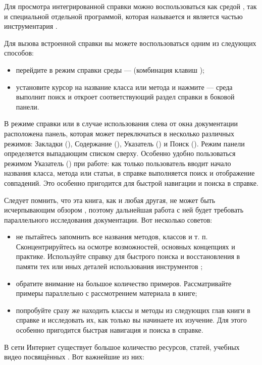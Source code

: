 Для просмотра интегрированной справки можно воспользоваться как средой , так и специальной
отдельной программой, которая называется 
и является частью инструментария .

Для  вызова встроенной справки вы можете воспользоваться одним из следующих способов:

\begin{itemize}
\item перейдите в режим справки среды  ---  (комбинация клавиш );
\item установите курсор на название класса или метода и нажмите  --- среда выполнит поиск и откроет
соответствующий раздел справки в боковой панели.
\end{itemize}
В режиме справки или в случае использования  слева от окна документации расположена панель,
которая может переключаться в несколько различных режимов: Закладки (),
Содержание (), Указатель () и Поиск (). Режим панели определяется
выпадающим списком сверху. Особенно удобно пользоваться режимом Указатель () при работе: 
как только пользователь
вводит начало названия класса, метода или статьи, в справке выполняется поиск и отображение совпадений.
Это особенно пригодится для быстрой навигации и поиска в справке.

Следует помнить, что эта книга, как и любая другая, не может быть исчерпывающим обзором , поэтому
дальнейшая работа с ней будет требовать параллельного исследования документации. Вот несколько советов:

\begin{itemize}
\item не пытайтесь запомнить все названия методов, классов и т. п. Сконцентрируйтесь на осмотре
возможностей, основных концепциях и практике. Используйте справку для быстрого поиска и восстановления в памяти тех или
иных деталей использования инструментов ;
\item обратите внимание на большое количество примеров. Рассматривайте примеры параллельно с рассмотрением
материала в книге;
\item попробуйте сразу же находить классы и методы из следующих глав книги в справке и исследовать их, как
только вы начинаете их изучение. Для этого особенно
пригодится быстрая навигация и поиска в справке.
\end{itemize}
В сети Интернет существует большое количество ресурсов, статей, учебных видео посвящённых . Вот
важнейшие из них:

